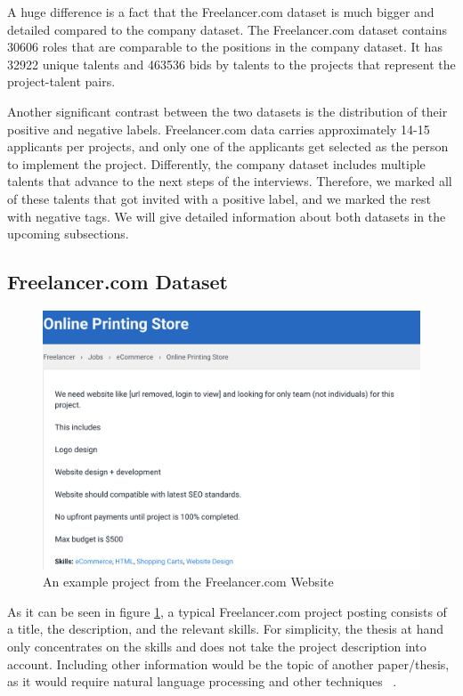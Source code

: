 A huge difference is a fact that the Freelancer.com dataset is much bigger and detailed compared to the company dataset. The Freelancer.com dataset contains 30606 roles that are comparable to the positions in the company dataset. It has 32922 unique talents and 463536 bids by talents to the projects that represent the project-talent pairs.



Another significant contrast between the two datasets is the distribution of their positive and negative labels. Freelancer.com data carries approximately 14-15 applicants per projects, and only one of the applicants get selected as the person to implement the project. Differently,  the company dataset includes multiple talents that advance to the next steps of the interviews. Therefore, we marked all of these talents that got invited with a positive label, and we marked the rest with negative tags. We will give detailed information about both datasets in the upcoming subsections.


\subsection{Freelancer.com Dataset}\label{implementation-subsection-freelancer}


\begin{figure}[htp]
	\centering
	\includegraphics[width=\textwidth]{figures/FreelancerExample.png}
	\caption{An example project from the Freelancer.com Website}
	\label{fig:freelancer-example-project}
\end{figure}


As it can be seen in figure \ref{fig:freelancer-example-project}, a typical Freelancer.com project posting consists of a title, the description, and the relevant skills. For simplicity, the thesis at hand only concentrates on the skills and does not take the project description into account. Including other information would be the topic of another paper/thesis, as it would require natural language processing and other techniques ~\parencite{bird2009natural}.


